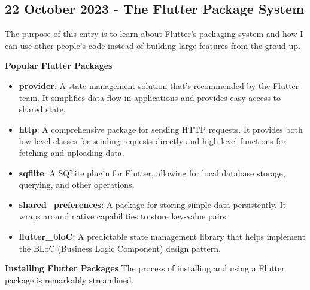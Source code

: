 \documentclass{article}
\begin{document}
\newpage
\subsection{22 October 2023 - The Flutter Package System}

The purpose of this entry is to learn about Flutter's packaging system and how I can use other people's code instead of building large features from the groud up.

\textbf{Popular Flutter Packages}

\begin{itemize}
    \item \textbf{provider}: A state management solution that's recommended by the Flutter team. It simplifies data flow in applications and provides easy access to shared state.

    \item \textbf{http}: A comprehensive package for sending HTTP requests. It provides both low-level classes for sending requests directly and high-level functions for fetching and uploading data.

    \item \textbf{sqflite}: A SQLite plugin for Flutter, allowing for local database storage, querying, and other operations.

    \item \textbf{shared\_preferences}: A package for storing simple data persistently. It wraps around native capabilities to store key-value pairs.

    \item \textbf{flutter\_bloC}: A predictable state management library that helps implement the BLoC (Business Logic Component) design pattern.
\end{itemize}

\textbf{Installing Flutter Packages}
The process of installing and using a Flutter package is remarkably streamlined.
\end{document}
